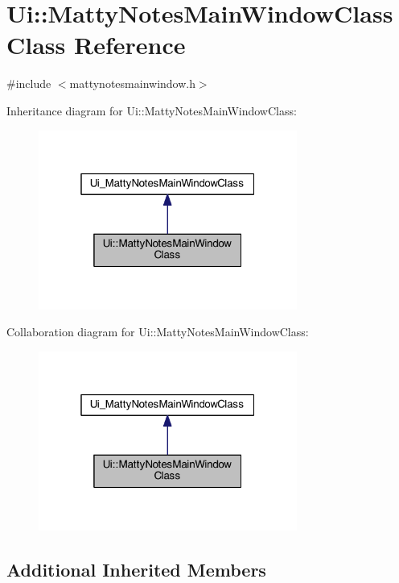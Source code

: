 \hypertarget{classUi_1_1MattyNotesMainWindowClass}{}\section{Ui\+:\+:Matty\+Notes\+Main\+Window\+Class Class Reference}
\label{classUi_1_1MattyNotesMainWindowClass}


{\ttfamily \#include $<$mattynotesmainwindow.\+h$>$}



Inheritance diagram for Ui\+:\+:Matty\+Notes\+Main\+Window\+Class\+:
\nopagebreak
\begin{figure}[H]
\begin{center}
\leavevmode
\includegraphics[width=241pt]{classUi_1_1MattyNotesMainWindowClass__inherit__graph}
\end{center}
\end{figure}


Collaboration diagram for Ui\+:\+:Matty\+Notes\+Main\+Window\+Class\+:
\nopagebreak
\begin{figure}[H]
\begin{center}
\leavevmode
\includegraphics[width=241pt]{classUi_1_1MattyNotesMainWindowClass__coll__graph}
\end{center}
\end{figure}
\subsection*{Additional Inherited Members}


